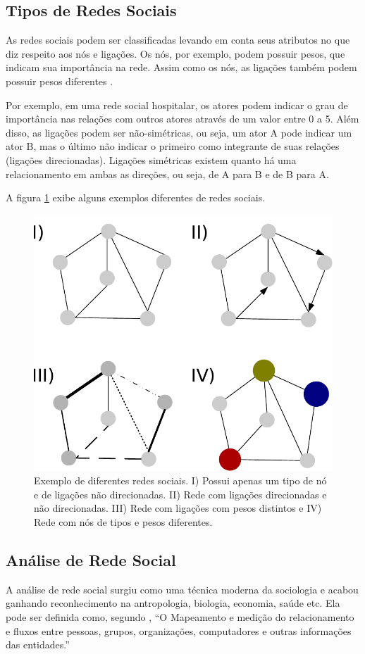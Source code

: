 \subsection{Tipos de Redes Sociais}
As redes sociais podem ser classificadas levando em conta seus atributos no que diz respeito aos nós e ligações. Os nós, por exemplo, podem possuir pesos, que indicam sua importância na rede. Assim como os nós, as ligações também podem possuir pesos diferentes \cite{pan2007effective}. 

Por exemplo, em uma rede social hospitalar, os atores podem indicar o grau de importância nas relações com outros atores através de um valor entre 0 a 5. Além disso, as ligações podem ser não-simétricas, ou seja, um ator A pode indicar um ator B, mas o último não indicar o primeiro como integrante de suas relações (ligações direcionadas). Ligações simétricas existem quanto há uma relacionamento em ambas as direções, ou seja, de A para B e de B para A.

A figura \ref{fig:graph-types} exibe alguns exemplos diferentes de redes sociais.

\begin{figure}[htbp]
\centering
 \includegraphics[width=.85\textwidth]{figuras/tipos.pdf}
 \caption{Exemplo de diferentes redes sociais. I) Possui apenas um tipo de nó e de ligações não direcionadas. II) Rede com ligações direcionadas e não direcionadas. III) Rede com ligações com pesos distintos e IV) Rede com nós de tipos e pesos diferentes.}
\label{fig:graph-types}
\end{figure}

\subsection{Análise de Rede Social}
A análise de rede social surgiu como uma técnica moderna da sociologia e acabou ganhando reconhecimento na antropologia, biologia, economia, saúde etc. Ela pode ser definida como, segundo \cite{krebs2015}, ``O Mapeamento e medição do relacionamento e fluxos entre pessoas, grupos, organizações, computadores e outras informações das entidades.''


